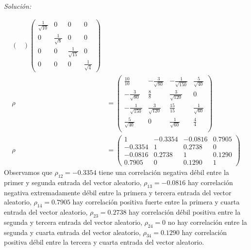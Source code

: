\documentclass[12pt]{article}
\newenvironment{sol}
    {\emph{Solución:}
    }
    {
    }
\begin{document}
\begin{sol}
\begin{align*}
\begin{pmatrix}
\end{pmatrix}
\begin{pmatrix}
\frac{1}{\sqrt{10}} & 0 & 0 & 0\\
0 &\frac{1}{\sqrt{8}}  & 0 & 0\\
0 & 0 & \frac{1}{\sqrt{15}}  & 0\\
0 &0 &0 & \frac{1}{\sqrt{4}} 
\end{pmatrix} \\
\rho &= 
\begin{pmatrix}
\frac{10}{10} & -\frac{3}{\sqrt{80}}& -\frac{1}{\sqrt{150}}& \frac{5}{\sqrt{40}} \\
-\frac{3}{\sqrt{80}} & \frac{8}{8}& \frac{3}{\sqrt{120}}& 0\\
-\frac{1}{\sqrt{150}} & \frac{3}{\sqrt{120}}& \frac{15}{15}& \frac{1}{\sqrt{60}}\\
\frac{5}{\sqrt{40}} & 0& \frac{1}{\sqrt{60}}& \frac{4}{4}\\
\end{pmatrix} \\
\rho &=
\begin{pmatrix}
1 & -0.3354 & -0.0816 & 0.7905 \\ 
-0.3354 & 1 & 0.2738 & 0 \\ 
-0.0816 & 0.2738 & 1 & 0.1290 \\
0.7905 & 0 & 0.1290 & 1
\end{pmatrix} 
\end{align*}
Observamos que $\rho_{12} = -0.3354$ tiene una correlación negativa débil entre la primer y segunda entrada del vector aleatorio, $\rho_{13}=-0.0816$ hay correlación negativa extremadamente débil entre la primera y tercera entrada del vector aleatorio, $\rho_{14}=0.7905$ hay correlación positiva fuerte entre la primera y cuarta entrada del vector aleatorio, $\rho_{23}=0.2738$ hay correlación débil positiva entre la segunda y tercera entrada del vector aleatorio, $\rho_{24}=0$ no hay correlación entre la segunda y cuarta entrada del vector aleatorio, $\rho_{34}=0.1290$ hay correlación positiva débil entre la tercera y cuarta entrada del vector aleatorio.
\end{sol}
\end{document}
